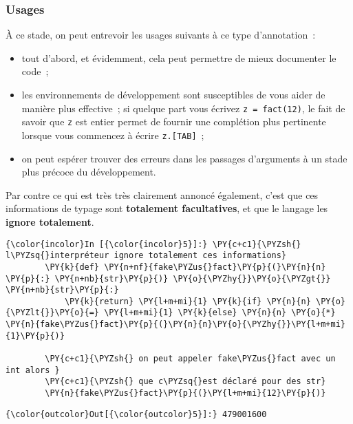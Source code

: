     \hypertarget{usages}{%
\subsubsection{Usages}\label{usages}}

    À ce stade, on peut entrevoir les usages suivants à ce type
d'annotation~:

\begin{itemize}
\tightlist
\item
  tout d'abord, et évidemment, cela peut permettre de mieux documenter
  le code~;
\item
  les environnements de développement sont susceptibles de vous aider de
  manière plus effective~; si quelque part vous écrivez
  \texttt{z\ =\ fact(12)}, le fait de savoir que \texttt{z} est entier
  permet de fournir une complétion plus pertinente lorsque vous
  commencez à écrire \texttt{z.{[}TAB{]}}~;
\item
  on peut espérer trouver des erreurs dans les passages d'arguments à un
  stade plus précoce du développement.
\end{itemize}

    Par contre ce qui est très très clairement annoncé également, c'est que
ces informations de typage sont \textbf{totalement facultatives}, et que
le langage les \textbf{ignore totalement}.

    \begin{Verbatim}[commandchars=\\\{\}]
{\color{incolor}In [{\color{incolor}5}]:} \PY{c+c1}{\PYZsh{} l\PYZsq{}interpréteur ignore totalement ces informations}
        \PY{k}{def} \PY{n+nf}{fake\PYZus{}fact}\PY{p}{(}\PY{n}{n} \PY{p}{:} \PY{n+nb}{str}\PY{p}{)} \PY{o}{\PYZhy{}}\PY{o}{\PYZgt{}} \PY{n+nb}{str}\PY{p}{:}
            \PY{k}{return} \PY{l+m+mi}{1} \PY{k}{if} \PY{n}{n} \PY{o}{\PYZlt{}}\PY{o}{=} \PY{l+m+mi}{1} \PY{k}{else} \PY{n}{n} \PY{o}{*} \PY{n}{fake\PYZus{}fact}\PY{p}{(}\PY{n}{n}\PY{o}{\PYZhy{}}\PY{l+m+mi}{1}\PY{p}{)}
        
        \PY{c+c1}{\PYZsh{} on peut appeler fake\PYZus{}fact avec un int alors }
        \PY{c+c1}{\PYZsh{} que c\PYZsq{}est déclaré pour des str}
        \PY{n}{fake\PYZus{}fact}\PY{p}{(}\PY{l+m+mi}{12}\PY{p}{)}
\end{Verbatim}


\begin{Verbatim}[commandchars=\\\{\}]
{\color{outcolor}Out[{\color{outcolor}5}]:} 479001600
\end{Verbatim}
            
